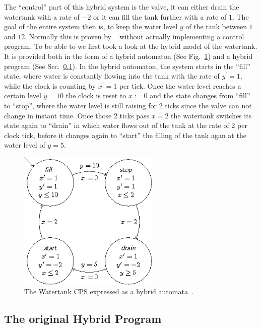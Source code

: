 The ``control'' part of this hybrid system is the valve, it can either drain the watertank with a rate of \(-2\) or it can fill the tank further with a rate of \(1\). The goal of the entire system then is, to keep the water level \(y\) of the tank between \(1\) and \(12\). Normally this is proven by \keym~ without actually implementing a control program. To be able to  we first took a look at the hybrid model of the watertank. It is provided both in the form of a hybrid automaton (See Fig.~\ref{fig:watertank_ha}) and a hybrid program (See Sec.~\ref{pdf:watertank_hp}). In the hybrid automaton, the system starts in the ``fill'' state, where water is constantly flowing into the tank with the rate of \(y^{\prime} = 1\), while the clock is counting by \(x^{\prime}=1\) per tick. Once the water level reaches a certain level \(y=10\) the clock is reset to \(x:=0\) and the state changes from ``fill'' to ``stop'', where the water level is still raising for 2 ticks since the valve can not change in instant time. Once those 2 ticks pass \(x=2\) the watertank switches its state again to ``drain'' in which water flows out of the tank at the rate of 2 per clock tick, before it changes again to ``start'' the filling of the tank agan at the water level of \(y=5\).
\begin{figure}
	\centering
	\includegraphics[width=0.6\textwidth]{images/watertank_ha}
	\caption{The Watertank CPS expressed as a hybrid automata~\cite{keymaeraGuide}.}
	\label{fig:watertank_ha}
\end{figure}
\subsection{The original Hybrid Program}
\label{pdf:watertank_hp}

